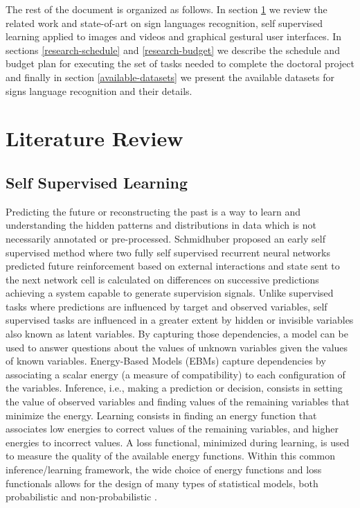 The rest of the document is organized as follows. In section \ref{literature-review} we review the related work and state-of-art on sign languages recognition, self supervised learning applied to images and videos and graphical gestural user interfaces. In sections \ref{research-schedule} and \ref{research-budget} we describe the schedule and budget plan for executing the set of tasks needed to complete the doctoral project and finally in section \ref{available-datasets} we present the available datasets for signs language recognition and their details.


\section{Literature Review}\label{literature-review}
\subsection{Self Supervised Learning}
Predicting the future or reconstructing the past is a way to learn and understanding the hidden patterns and distributions in data which is not necessarily annotated or pre-processed. Schmidhuber proposed an early self supervised method \cite{schmidhuber1990making} where two fully self supervised recurrent neural networks predicted future reinforcement based on external interactions and state sent to the next network cell is calculated on differences on successive predictions achieving a system capable to generate supervision signals. Unlike supervised tasks where predictions are influenced by target and observed variables, self supervised tasks are influenced in a greater extent by hidden or invisible variables also known as latent variables. By capturing those dependencies, a model can be used to answer questions about the values of unknown variables given the values of known variables. Energy-Based Models (EBMs) capture dependencies by associating a scalar energy (a measure of compatibility) to each configuration of the variables. Inference, i.e., making a prediction or decision, consists in setting the value of observed variables and finding values of the remaining variables that minimize the energy. Learning consists in finding an energy function that associates low energies to correct values of the remaining variables, and higher energies to incorrect values. A loss functional, minimized during learning, is used to measure the quality of the available energy functions. Within this common inference/learning framework, the wide choice of energy functions and loss functionals allows for the design of many types of statistical models, both probabilistic and non-probabilistic \cite{lecun2006tutorial}.

